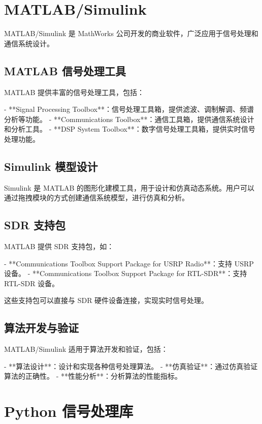 \documentclass[UTF8]{ctexbook}
\begin{document}
\section{MATLAB/Simulink}

MATLAB/Simulink 是 MathWorks 公司开发的商业软件，广泛应用于信号处理和通信系统设计。

\subsection{MATLAB 信号处理工具}

MATLAB 提供丰富的信号处理工具，包括：

- **Signal Processing Toolbox**：信号处理工具箱，提供滤波、调制解调、频谱分析等功能。
- **Communications Toolbox**：通信工具箱，提供通信系统设计和分析工具。
- **DSP System Toolbox**：数字信号处理工具箱，提供实时信号处理功能。

\subsection{Simulink 模型设计}

Simulink 是 MATLAB 的图形化建模工具，用于设计和仿真动态系统。用户可以通过拖拽模块的方式创建通信系统模型，进行仿真和分析。

\subsection{SDR 支持包}

MATLAB 提供 SDR 支持包，如：

- **Communications Toolbox Support Package for USRP Radio**：支持 USRP 设备。
- **Communications Toolbox Support Package for RTL-SDR**：支持 RTL-SDR 设备。

这些支持包可以直接与 SDR 硬件设备连接，实现实时信号处理。

\subsection{算法开发与验证}

MATLAB/Simulink 适用于算法开发和验证，包括：

- **算法设计**：设计和实现各种信号处理算法。
- **仿真验证**：通过仿真验证算法的正确性。
- **性能分析**：分析算法的性能指标。

\section{Python 信号处理库}
\end{document}
